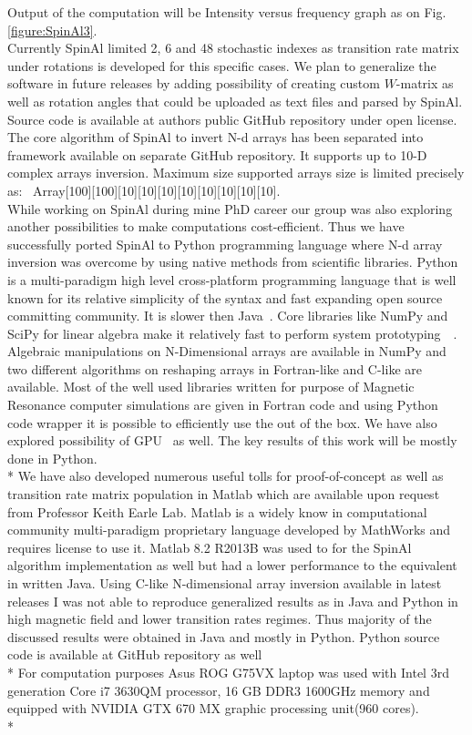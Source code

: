Output of the computation will be Intensity versus frequency graph as on Fig.\ref{figure:SpinAl3}. \\
Currently SpinAl limited 2, 6 and 48 stochastic indexes as transition rate matrix under rotations is developed for this specific cases. We plan to generalize the software in future releases by adding possibility of creating custom $W$-matrix as well as rotation angles that could be uploaded as text files and parsed by SpinAl. Source code is available at authors public GitHub repository under open license\cite{nmrgit}.\\
The core algorithm of SpinAl to invert N-d arrays has been separated into framework available on separate GitHub repository\cite{ndgit}. It supports up to 10-D complex arrays inversion. Maximum size supported arrays size is limited precisely as: \ Array[100][100][10][10][10][10][10][10][10][10].\\
While working on SpinAl during mine PhD career our group was also exploring another possibilities to make computations cost-efficient. Thus we have successfully ported SpinAl to Python programming language where N-d array inversion was overcome by using native methods from scientific libraries. Python is a multi-paradigm high level cross-platform programming language that is well known for its relative simplicity of the syntax and fast expanding open source committing community. It is slower then Java~\cite{slower}. Core libraries like NumPy and SciPy \cite{scipy} for linear algebra make it relatively fast to perform system prototyping~\cite{SciPy1}~\cite{SciPy2}. Algebraic manipulations on N-Dimensional arrays are available in NumPy \cite{numpy} and two different algorithms on reshaping arrays in Fortran-like and C-like are available. Most of the well used libraries written for purpose of Magnetic Resonance computer simulations are given in Fortran code and using Python code wrapper it is possible to efficiently use the out of the box. We have also explored possibility of GPU~\cite{gpu} as well. The key results of this work will be mostly done in Python.\\*
We have also developed numerous useful tolls for proof-of-concept as well as transition rate matrix population in Matlab which are available upon request from Professor Keith Earle Lab. Matlab is a widely know in computational community multi-paradigm proprietary language developed by MathWorks and requires license to use it. Matlab 8.2 R2013B was used to for the SpinAl algorithm implementation as well but had a lower performance to the equivalent in written Java. Using C-like N-dimensional array inversion available in latest releases I was not able to reproduce generalized results as in Java and Python in high magnetic field and lower transition rates regimes. Thus majority of the discussed results were obtained in Java and mostly in Python. Python source code is available at GitHub repository as well~\cite{eprgit}\\*
For computation purposes Asus ROG G75VX laptop was used with Intel 3rd generation Core i7 3630QM  processor, 16 GB DDR3 1600GHz memory and equipped with NVIDIA GTX 670 MX graphic processing unit(960 cores).\\* 
